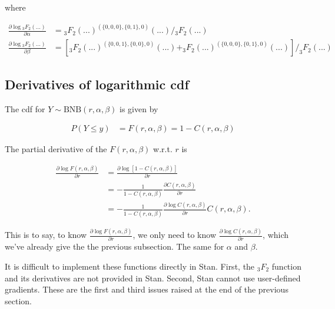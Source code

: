 \documentclass[11pt]{article}
\begin{document}
where

\begin{equation}
  \begin{aligned}
\frac{\partial \log {}_3F_2(...)}{\partial \alpha}
&=  {}_3F_2(...)^{(\{0,0,0\},\{0,1\},0)}(...)  / {}_3F_2(...) \\
\frac{\partial \log {}_3F_2(...)}{\partial \beta}
&= \left[ _3F_2(...)^{(\{0,0,1\},\{0,0\},0)}(...) + _3F_2(...)^{(\{0,0,0\},\{0,1\},0)}(...) \right]  / _3F_2(...)
  \end{aligned}
\end{equation}




\subsection*{Derivatives of logarithmic cdf}
The cdf for $Y\sim \text{BNB}(r,\alpha,\beta)$ is given by

\begin{equation}
\begin{aligned}
 P(Y\leq y) &= F(r,\alpha,\beta) = 1 - C(r,\alpha,\beta)
\end{aligned}
\end{equation}

The partial derivative of the $F(r,\alpha,\beta)$ w.r.t. $r$ is

\begin{equation}
\begin{aligned}
	\frac{\partial \log F(r,\alpha,\beta)}{\partial r} &= \frac{\partial \log [1 - C(r,\alpha,\beta)]}{\partial r}\\
	 &= - \frac{1}{1 - C(r,\alpha,\beta)} \frac{\partial C(r,\alpha,\beta)}{\partial r} \\
	 &= - \frac{1}{1 - C(r,\alpha,\beta)} \frac{\partial \log C(r,\alpha,\beta)}{\partial r} C(r,\alpha,\beta).
\end{aligned}
\end{equation}

This is to say, to know $\frac{\partial \log F(r,\alpha,\beta)}{\partial r}$, we only need to know $\frac{\partial \log C(r,\alpha,\beta)}{\partial r}$, which we've already give the the previous subsection. The same for $\alpha$ and $\beta$.



It is difficult to implement these functions directly in Stan. First, the ${}_3F_2$ function and its derivatives are not provided in Stan. Second, Stan cannot use user-defined gradients. These are the first and third issues raised at the end of the previous section.
\end{document}
